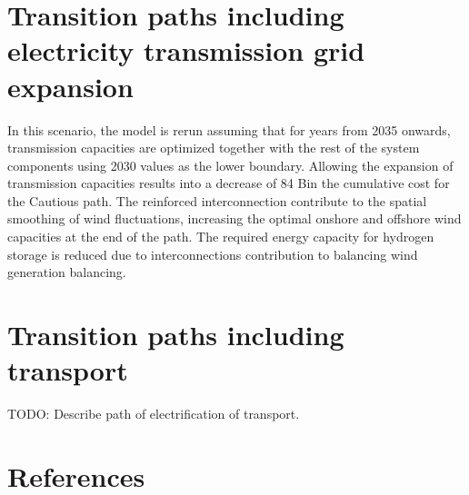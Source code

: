 \documentclass[3p]{elsarticle} %
\begin{document}
\section{Transition paths including electricity transmission grid expansion}

In this scenario, the model is rerun assuming that for years from 2035 onwards, transmission capacities are optimized together with the rest of the system components using 2030 values as the lower boundary. Allowing the expansion of transmission capacities results into a decrease of 84 B\EUR in the cumulative cost for the Cautious path. The reinforced interconnection contribute to the spatial smoothing of wind fluctuations, increasing the optimal onshore and offshore wind capacities at the end of the path. The required energy capacity for hydrogen storage is reduced due to interconnections contribution to balancing wind generation balancing. 

\FloatBarrier

\section{Transition paths including transport}

\textcolor[rgb]{1,0,0}{TODO: Describe path of electrification of transport.}

\section{References}

\end{document}
